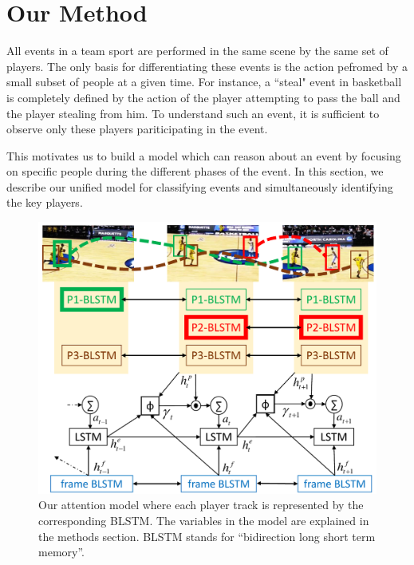 \section{Our Method}
\label{sec:methods}

All events in a team sport are performed in the same scene by the same set
of players. The only basis for differentiating these events is the action
pefromed by a small subset of people at a given time.  For instance, a
``steal" event in basketball is completely defined by the action of the player attempting to
pass the ball and the player stealing from him.  To understand such an event,
it is sufficient to observe only these players pariticipating in the event.

This motivates us to build a model which can reason about an event by focusing
on specific people during the different phases of the event.
In this section, we describe our unified model for classifying events
and simultaneously identifying the key players.

\begin{figure}[t!]
\begin{center}
    \includegraphics[width=3 in]{images/system_figure_1_cropped_v2.pdf}
\end{center}
   \caption{Our attention model where each player track is represented by the
     corresponding BLSTM. The variables in the model are explained in the
     methods section.  BLSTM stands for ``bidirection long short term memory''.
}
\label{fig:model}
\end{figure}

